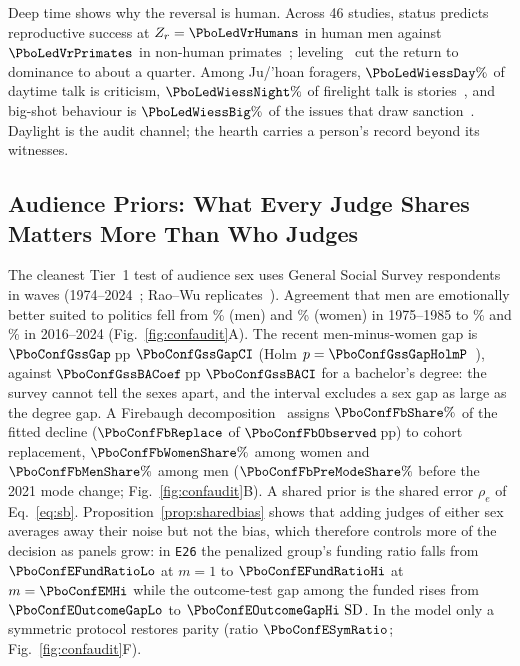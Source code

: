 Deep time shows why the reversal is human. Across 46 studies, status predicts reproductive success at $Z_r=\PboLedVrHumans$ in human men against $\PboLedVrPrimates$ in non-human primates~\cite{vonrueden2016}; leveling~\cite{boehm1993,boehm1999} cut the return to dominance to about a quarter. Among Ju/'hoan foragers, $\PboLedWiessDay\%$ of daytime talk is criticism, $\PboLedWiessNight\%$ of firelight talk is stories~\cite{wiessner2014}, and big-shot behaviour is $\PboLedWiessBig\%$ of the issues that draw sanction~\cite{wiessner2005}. Daylight is the audit channel; the hearth carries a person's record beyond its witnesses.

\subsection{Audience Priors: What Every Judge Shares Matters More Than Who Judges}
The cleanest Tier~1 test of audience sex uses \PboConfGssN{} General Social Survey respondents in \PboConfGssWaves{} waves (1974--2024~\cite{gss2024}; Rao--Wu replicates~\cite{raowu1988}). Agreement that men are emotionally better suited to politics fell from \PboConfGssEarlyMen\% (men) and \PboConfGssEarlyWomen\% (women) in 1975--1985 to \PboConfGssRecentMen\% and \PboConfGssRecentWomen\% in 2016--2024 (Fig.~\ref{fig:confaudit}A). The recent men-minus-women gap is $\PboConfGssGap$\,pp $\PboConfGssGapCI$ (Holm $p=\PboConfGssGapHolmP$~\cite{holm1979}), against $\PboConfGssBACoef$\,pp $\PboConfGssBACI$ for a bachelor's degree: the survey cannot tell the sexes apart, and the interval excludes a sex gap as large as the degree gap. A Firebaugh decomposition~\cite{firebaugh1989} assigns $\PboConfFbShare\%$ of the fitted decline ($\PboConfFbReplace$ of $\PboConfFbObserved$\,pp) to cohort replacement, $\PboConfFbWomenShare\%$ among women and $\PboConfFbMenShare\%$ among men ($\PboConfFbPreModeShare\%$ before the 2021 mode change; Fig.~\ref{fig:confaudit}B). A shared prior is the shared error $\rho_e$ of Eq.~\eqref{eq:sb}. Proposition~\ref{prop:sharedbias} shows that adding judges of either sex averages away their noise but not the bias, which therefore controls more of the decision as panels grow: in \texttt{E26} the penalized group's funding ratio falls from $\PboConfEFundRatioLo$ at $m=1$ to $\PboConfEFundRatioHi$ at $m=\PboConfEMHi$ while the outcome-test gap among the funded rises from $\PboConfEOutcomeGapLo$ to $\PboConfEOutcomeGapHi\,\SD$. In the model only a symmetric protocol restores parity (ratio $\PboConfESymRatio$; Fig.~\ref{fig:confaudit}F).

